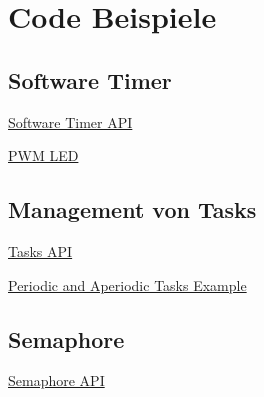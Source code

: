 \newpage
\onecolumn

\section{Code Beispiele}

\subsection{Software Timer}

\underline{Software Timer API}


\underline{PWM LED}



\subsection{Management von Tasks} \label{sec:task_management}

\underline{Tasks API}


\underline{Periodic and Aperiodic Tasks Example}


\subsection{Semaphore} \label{sec:semaphore_api}

\underline{Semaphore API}
